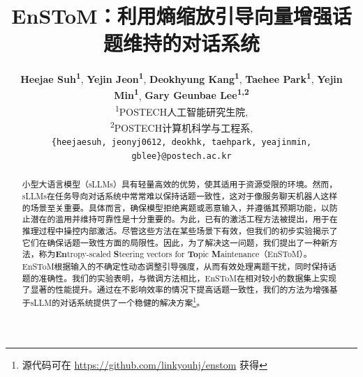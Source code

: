 \documentclass[11pt]{article}
\title{EnSToM：利用熵缩放引导向量增强话题维持的对话系统}
\author{
 \textbf{Heejae Suh\textsuperscript{1}},
 \textbf{Yejin Jeon\textsuperscript{1}},
 \textbf{Deokhyung Kang\textsuperscript{1}},
 \textbf{Taehee Park\textsuperscript{1}},
 \textbf{Yejin Min\textsuperscript{1}},
 \textbf{Gary Geunbae Lee\textsuperscript{1,2}}
\\
 \textsuperscript{1}POSTECH人工智能研究生院,\\
 \textsuperscript{2}POSTECH计算机科学与工程系,
\\
 \texttt{\{heejaesuh, jeonyj0612, deokhk, taehpark, yeajinmin, gblee\}@postech.ac.kr}\\
}
\begin{document}
\maketitle
\begin{abstract}
小型大语言模型（sLLMs）具有轻量高效的优势，使其适用于资源受限的环境。然而，sLLMs在任务导向对话系统中常常难以保持话题一致性，这对于像服务聊天机器人这样的场景至关重要。具体而言，确保模型拒绝离题或恶意输入，并遵循其预期功能，以防止潜在的滥用并维持可靠性是十分重要的。为此，已有的激活工程方法被提出，用于在推理过程中操控内部激活。尽管这些方法在某些场景下有效，但我们的初步实验揭示了它们在确保话题一致性方面的局限性。因此，为了解决这一问题，我们提出了一种新方法，称为\textbf{En}tropy-scaled \textbf{S}teering vectors for \textbf{To}pic \textbf{M}aintenance（EnSToM）。EnSToM根据输入的不确定性动态调整引导强度，从而有效处理离题干扰，同时保持话题的准确性。我们的实验表明，与微调方法相比，EnSToM在相对较小的数据集上实现了显著的性能提升。通过在不影响效率的情况下提高话题一致性，我们的方法为增强基于sLLM的对话系统提供了一个稳健的解决方案\footnote{源代码可在 \url{https://github.com/linkyouhj/enstom} 获得}。

\end{abstract}
\end{document}

